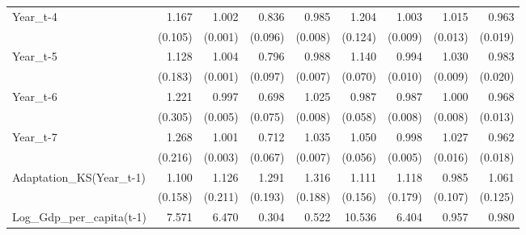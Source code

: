 \begin{table}[htbp]
\begin{tabular}{l*{8}{D{.}{.}{-1}}}
Year\_t-4            &       1.167\sym{*}  &       1.002\sym{\%}  &       0.836\sym{\%}  &       0.985\sym{*}  &       1.204\sym{*}  &       1.003         &       1.015         &       0.963\sym{*}  \\
                    &     (0.105)         &     (0.001)         &     (0.096)         &     (0.008)         &     (0.124)         &     (0.009)         &     (0.013)         &     (0.019)         \\
Year\_t-5            &       1.128         &       1.004\sym{***}&       0.796\sym{*}  &       0.988\sym{*}  &       1.140\sym{**} &       0.994         &       1.030\sym{***}&       0.983         \\
                    &     (0.183)         &     (0.001)         &     (0.097)         &     (0.007)         &     (0.070)         &     (0.010)         &     (0.009)         &     (0.020)         \\
Year\_t-6            &       1.221         &       0.997         &       0.698\sym{***}&       1.025\sym{***}&       0.987         &       0.987\sym{\%}  &       1.000         &       0.968\sym{**} \\
                    &     (0.305)         &     (0.005)         &     (0.075)         &     (0.008)         &     (0.058)         &     (0.008)         &     (0.008)         &     (0.013)         \\
Year\_t-7            &       1.268         &       1.001         &       0.712\sym{***}&       1.035\sym{***}&       1.050         &       0.998         &       1.027\sym{*}  &       0.962\sym{**} \\
                    &     (0.216)         &     (0.003)         &     (0.067)         &     (0.007)         &     (0.056)         &     (0.005)         &     (0.016)         &     (0.018)         \\
Adaptation\_KS(Year\_t-1)&       1.100         &       1.126         &       1.291\sym{*}  &       1.316\sym{*}  &       1.111         &       1.118         &       0.985         &       1.061         \\
                    &     (0.158)         &     (0.211)         &     (0.193)         &     (0.188)         &     (0.156)         &     (0.179)         &     (0.107)         &     (0.125)         \\
Log\_Gdp\_per\_capita(t-1)&       7.571\sym{***}&       6.470\sym{**} &       0.304\sym{**} &       0.522\sym{**} &      10.536\sym{**} &       6.404\sym{**} &       0.957         &       0.980         \\

\end{tabular}
\end{table}
